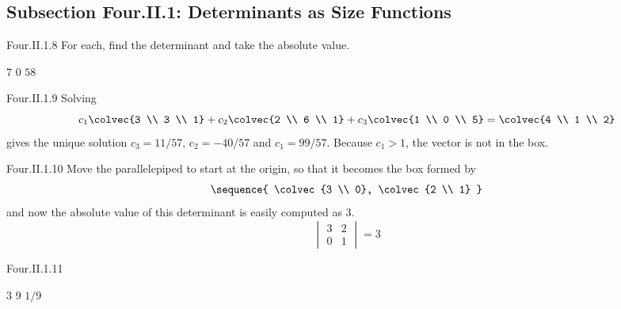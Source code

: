 \subsection{Subsection Four.II.1: Determinants as Size Functions}
\begin{ans}{Four.II.1.8}
      For each, find the determinant and take the absolute value.
      \begin{exparts*}
        \partsitem $7$
        \partsitem $0$
        \partsitem $58$
      \end{exparts*}
    
\end{ans}
\begin{ans}{Four.II.1.9}
      Solving
      \begin{equation*}
        c_1\colvec{3 \\ 3 \\ 1}
        +c_2\colvec{2 \\ 6 \\ 1}
        +c_3\colvec{1 \\ 0 \\ 5}
        =\colvec{4 \\ 1 \\ 2}
      \end{equation*}
      gives the unique solution
      \( c_3=11/57 \), \( c_2=-40/57 \) and \( c_1=99/57 \).
      Because \( c_1>1 \), the vector is not in the box.
    
\end{ans}
\begin{ans}{Four.II.1.10}
      Move the parallelepiped to start at the origin,
      so that it becomes the box formed by
      \begin{equation*}
        \sequence{
          \colvec{3 \\ 0},
          \colvec{2 \\ 1}
        }
      \end{equation*}
      and now the absolute value of this determinant is
      easily computed as $3$.
      \begin{equation*}
        \begin{vmatrix}
          3  &2  \\
          0  &1
        \end{vmatrix}=3
      \end{equation*}
     
\end{ans}
\begin{ans}{Four.II.1.11}
     \begin{exparts*}
        \partsitem \( 3 \)
        \partsitem \( 9 \)
        \partsitem $1/9$
      \end{exparts*}
    
\end{ans}
